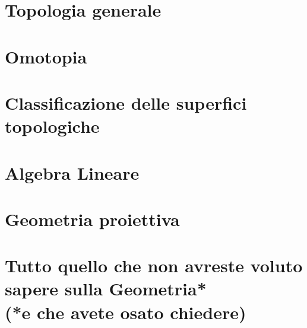 \documentclass[a4paper, 11pt, twoside, openright, italian]{memoir}
\begin{document}
\frontmatter

%


\mainmatter

\part{Topologia generale}






\part{Omotopia}


\part{Classificazione delle superfici topologiche}

\part{Algebra Lineare}

\part{Geometria proiettiva}


\appendix
\part{Tutto quello che non avreste voluto sapere sulla Geometria*\\
\small{(*e che avete osato chiedere)}}




%
\backmatter

\end{document}
